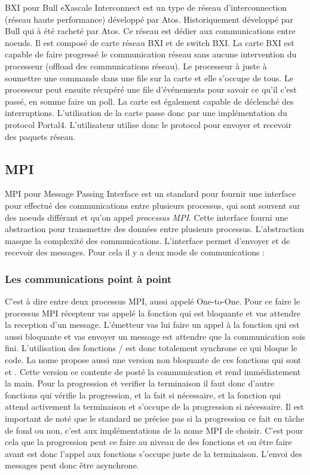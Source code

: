 BXI pour Bull eXascale Interconnect est un type de réseau d'interconnection (réseau haute performance) développé par Atos.
Historiquement développé par Bull qui à été racheté par Atos.
Ce réseau est dédier aux communications entre noeuds. Il est composé de carte réseau BXI et de switch BXI.
La carte BXI est capable de faire progressé le communication réseau sans aucune intervention du processeur (offload des communications réseau). %
Le processeur à juste à soumettre une commande dans une file sur la carte et elle s'occupe de tous.
Le processeur peut ensuite récupéré une file d'événements pour savoir ce qu'il c'est passé, en somme faire un poll.
La carte est également capable de déclenché des interruptions.
L'utilisation de la carte passe donc par une implémentation du protocol Portal4.
L'utilisateur utilise donc le protocol pour envoyer et recevoir des paquets réseau.

\subsection{MPI}

MPI pour Message Passing Interface est un standard pour fournir une interface pour effectué des communications entre plusieurs processus, qui sont souvent sur des noeuds différant et qu'on appel \emph{processus MPI}.
Cette interface fourni une abstraction pour transmettre des données entre plusieurs processus.
L'abstraction masque la complexité des communications.
L'interface permet d'envoyer et de recevoir des messages. Pour cela il y a deux mode de communications :

\subsubsection{Les communications point à point}

C'est à dire entre deux processus MPI, aussi appelé One-to-One.
Pour ce faire le processus MPI récepteur vas appelé la fonction  qui est bloquante et vas attendre la reception d'un message.
L'émetteur vas lui faire un appel à la fonction  qui est aussi bloquante et vas envoyer un message est attendre que la communication sois fini.
L'utilisation des fonctions  /  est donc totalement synchrone ce qui bloque le code.
La nome propose aussi une version non bloquante de ces fonctions qui sont  et .
Cette version ce contente de posté la communication et rend immédiatement la main.
Pour la progression et verifier la terminaison il faut donc d'autre fonctions  qui vérifie la progression, et la fait si nécessaire, et la fonction  qui attend activement la terminaison et s'occupe de la progression si nécessaire.
Il est important de noté que le standard ne précise pas si la progression ce fait en tâche de fond ou non, c'est aux implémentations de la nome MPI de choisir.
C'est pour cela que la progression peut ce faire au niveau de des fonctions  et  ou être faire avant est donc l'appel aux fonctions s'occupe juste de la terminaison.
L'envoi des messages peut donc être asynchrone.


